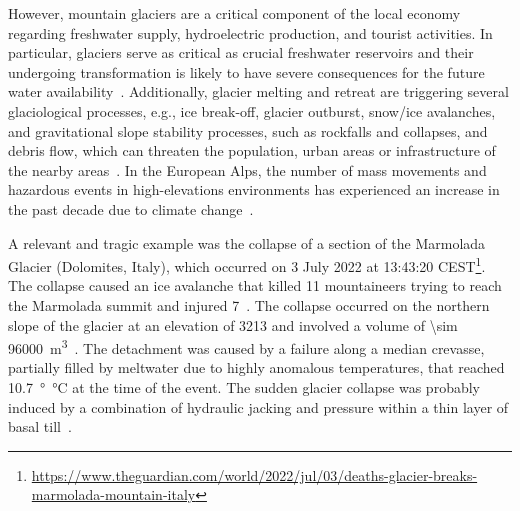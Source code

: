 However, mountain glaciers are a critical component of the local economy regarding freshwater supply, hydroelectric production, and tourist activities.
In particular, glaciers serve as critical as crucial freshwater reservoirs and their undergoing transformation is likely to have severe consequences for the future water availability~\citep{Barnett2005, hock2005}. 
Additionally, glacier melting and retreat are triggering several glaciological processes, e.g., ice break-off, glacier outburst, snow/ice avalanches, and gravitational slope stability processes, such as rockfalls and collapses, and debris flow, which can threaten the population, urban areas or infrastructure of the nearby areas~\citep{Kaab2004, Deline2015, Giordan2020}.
In the European Alps, the number of mass movements and hazardous events in high-elevations environments has experienced an increase in the past decade due to climate change~\citep{chiarle2023, Nigrelli2024}.

A relevant and tragic example was the collapse of a section of the Marmolada Glacier 
(Dolomites, Italy), which occurred on 3 July 2022 at 13:43:20 CEST\footnote{\url{https://www.theguardian.com/world/2022/jul/03/deaths-glacier-breaks-marmolada-mountain-italy}}. 
The collapse caused an ice avalanche that killed 11 mountaineers trying to reach the Marmolada summit and injured 7~\citep{Olivieri2023, Bondesan2023}.
The collapse occurred on the northern slope of the glacier at an elevation of \SI{3213}{\masl} and involved a volume of \SI{\sim 96000}{\cubic\meter}~\citep{Olivieri2023}.
The detachment was caused by a failure along a median crevasse, partially filled by meltwater due to highly anomalous temperatures, that reached \SI{10.7}{\degree\celsius} at the time of the event.
The sudden glacier collapse was probably induced by a combination of hydraulic jacking and pressure within a thin layer of basal till~\citep{Bondesan2023}.


